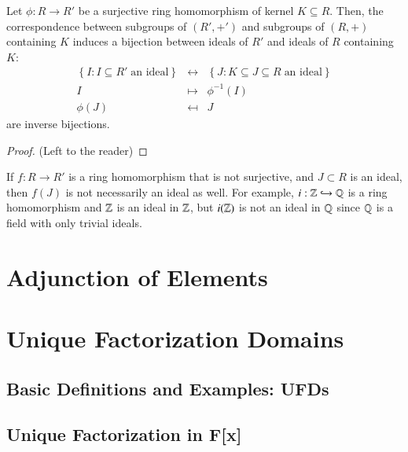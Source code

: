 \documentclass[12pt, a4paper, oneside, openright, titlepage]{book}
\begin{document}
\begin{namthm}\label{thmname:corrring}
    Let $\phi:R \rightarrow R'$ be a surjective ring homomorphism of kernel $K \subseteq R$. Then, the correspondence between subgroups of $(R',+')$ and subgroups of $(R,+)$ containing $K$ induces a bijection between ideals of $R'$ and ideals of $R$ containing $K$: 
    \begin{equation}
        \begin{array}{rcl}
            \left\{I:I\subseteq R'\;\text{an ideal}\right\} &\leftrightarrow& \left\{J:K \subseteq J \subseteq R\;\text{an ideal}\right\} \\
            I &\mapsto& \phi^{-1}(I) \\
            \phi(J) &\mapsfrom& J
        \end{array}
    \end{equation}
    are inverse bijections.
\end{namthm}
\begin{proof}
    (Left to the reader)
\end{proof}

\begin{rmk}
        If $f:R\rightarrow R'$ is a ring homomorphism that is not surjective, and $J \subset R$ is an ideal, then $f(J)$ is not necessarily an ideal as well. For example, $i:\mathbb Z\hookrightarrow \mathbb Q$ is a ring homomorphism and $\mathbb Z$ is an ideal in $\mathbb Z$, but $i(\mathbb Z)$ is not an ideal in $\mathbb Q$ since $\mathbb Q$ is a field with only trivial ideals.
\end{rmk}


\chapter{\textsection\textsection Adjunction of Elements}




\chapter{\textsection\textsection Unique Factorization Domains}

\section{\textsection Basic Definitions and Examples: UFDs}


\section{\textsection Unique Factorization in F[x]}
\end{document}
